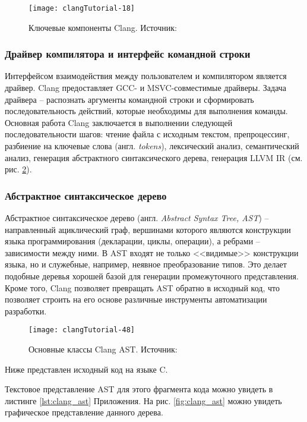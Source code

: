 \begin{figure}[h]
  \centering
  \texttt{[image: clangTutorial-18]}
  \caption{Ключевые компоненты Clang. Источник: \cite{VanHaagstretSvenARMandStulova2019}}
  \label{fig:clang_core}
\end{figure}
\subsubsection{Драйвер компилятора и интерфейс командной строки}
Интерфейсом взаимодействия между пользователем и компилятором является драйвер.
Clang предоставляет GCC- и MSVC-совместимые драйверы. Задача драйвера --
распознать аргументы командной строки и сформировать последовательность действий,
которые необходимы для выполнения команды. Основная работа Clang заключается
в выполнении следующей последовательности шагов: чтение файла с исходным текстом,
препроцессинг, разбиение на ключевые слова (англ. \textit{tokens}), лексический
анализ, семантический анализ, генерация абстрактного синтаксического дерева,
генерация LLVM IR (см. рис. \ref{fig:clang_core}).

\subsubsection{Абстрактное синтаксическое дерево}
Абстрактное синтаксическое дерево (англ. \textit{Abstract Syntax Tree, AST}) --
направленный ациклический граф, вершинами которого являются конструкции языка 
программирования (декларации, циклы, операции), а ребрами -- зависимости между
ними. В AST входят не только <<видимые>> конструкции языка, но и служебные,
например, неявное преобразование типов. Это делает подобные деревья хорошей
базой для генерации промежуточного представления. Кроме того, Clang позволяет
превращать AST обратно в исходный код, что позволяет строить на его основе
различные инструменты автоматизации разработки.
\begin{figure}[h]
  \centering
  \texttt{[image: clangTutorial-48]}
  \caption{Основные классы Clang AST. Источник: \cite{VanHaagstretSvenARMandStulova2019}}
  \label{fig:clang_core}
\end{figure}

Ниже представлен исходный код на языке C.

Текстовое представление AST для этого фрагмента кода можно увидеть в листинге
\ref{lst:clang_ast} Приложения. На рис. \ref{fig:clang_ast} можно увидеть
графическое представление данного дерева.


